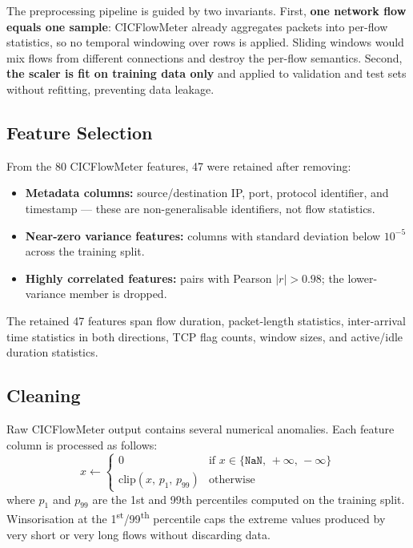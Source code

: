 \documentclass[12pt]{article}
\theoremstyle{plain}
\begin{document}
The preprocessing pipeline is guided by two invariants. First, \textbf{one network flow equals one sample}: CICFlowMeter already aggregates packets into per-flow statistics, so no temporal windowing over rows is applied. Sliding windows would mix flows from different connections and destroy the per-flow semantics. Second, \textbf{the scaler is fit on training data only} and applied to validation and test sets without refitting, preventing data leakage.

\subsection{Feature Selection}

From the 80 CICFlowMeter features, 47 were retained after removing:
\begin{itemize}
  \item \textbf{Metadata columns:} source/destination IP, port, protocol identifier, and timestamp — these are non-generalisable identifiers, not flow statistics.
  \item \textbf{Near-zero variance features:} columns with standard deviation below $10^{-5}$ across the training split.
  \item \textbf{Highly correlated features:} pairs with Pearson $|r| > 0.98$; the lower-variance member is dropped.
\end{itemize}

The retained 47 features span flow duration, packet-length statistics, inter-arrival time statistics in both directions, TCP flag counts, window sizes, and active/idle duration statistics.

\subsection{Cleaning}

Raw CICFlowMeter output contains several numerical anomalies. Each feature column is processed as follows:
\begin{equation}
x \leftarrow \begin{cases} 0 & \text{if } x \in \{\texttt{NaN},\, +\infty,\, -\infty\} \\ \text{clip}(x,\, p_1,\, p_{99}) & \text{otherwise} \end{cases}
\end{equation}
where $p_1$ and $p_{99}$ are the 1st and 99th percentiles computed on the training split. Winsorisation at the 1\textsuperscript{st}/99\textsuperscript{th} percentile caps the extreme values produced by very short or very long flows without discarding data.
\end{document}
